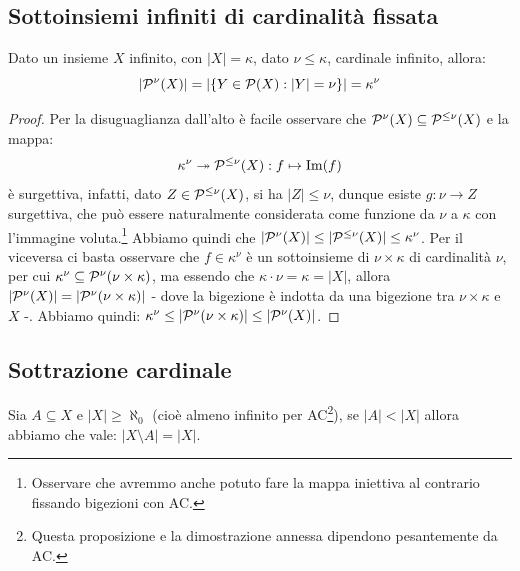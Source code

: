 \pagebreak
\subsection{Sottoinsiemi infiniti di cardinalit\`a fissata}
\begin{proposition}
	Dato un insieme $X$ infinito, con $|X| = \kappa$, dato $\nu \leq \kappa$, cardinale infinito, allora:
	\[ |\mathcal{P}^\nu(X)| = |\{Y \in \mathcal{P}(X) : |Y| = \nu\}| = \kappa^\nu
		\]
\end{proposition}

\begin{proof}
	Per la disuguaglianza dall'alto \`e facile osservare che $\mathcal{P}^{\nu}(X) \subseteq \mathcal{P}^{\leq \nu}(X)$ e la mappa:
	\[ \kappa^\nu \twoheadrightarrow \mathcal{P}^{\leq \nu}(X) : f \mapsto \operatorname{Im}(f)
		\]
	\`e surgettiva, infatti, dato $Z \in \mathcal{P}^{\leq \nu}(X)$, si ha $|Z| \leq \nu$, dunque esiste $g : \nu \to Z$ surgettiva, che pu\`o essere naturalmente considerata come funzione da $\nu$ a $\kappa$ con l'immagine voluta.\footnote{Osservare che avremmo anche potuto fare la mappa iniettiva al contrario fissando bigezioni con AC.}
	Abbiamo quindi che $|\mathcal{P}^\nu(X)| \leq |\mathcal{P}^{\leq \nu}(X)| \leq \kappa^\nu$. Per il viceversa ci basta osservare che $f\in \kappa^\nu$ \`e un sottoinsieme di $\nu \times \kappa$ di cardinalit\`a $\nu$, per cui $\kappa^\nu \subseteq \mathcal{P}^{\nu}(\nu \times \kappa)$,
	ma essendo che $\kappa \cdot \nu = \kappa  = |X|$, allora $|\mathcal{P}^{\nu}(X)| = |\mathcal{P}^{\nu}(\nu \times \kappa)|$ - dove la bigezione \`e indotta da una bigezione tra $\nu \times \kappa$ e $X$ -. Abbiamo quindi: $\kappa^\nu \leq |\mathcal{P}^\nu(\nu \times \kappa)| \leq |\mathcal{P}^\nu(X)|$.
\end{proof}

\subsection{Sottrazione cardinale}
\begin{proposition}
	Sia $A \subseteq X$ e $|X| \geq \aleph_0$ (cio\`e almeno infinito per AC\footnote{Questa proposizione e la dimostrazione annessa dipendono pesantemente da AC.}), se $|A| < |X|$ allora abbiamo che vale: $|X \setminus A| = |X|$.
\end{proposition}

